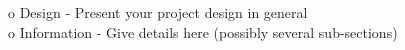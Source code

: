 o   Design - Present your project design in general\\
o   Information - Give details here (possibly several sub-sections)